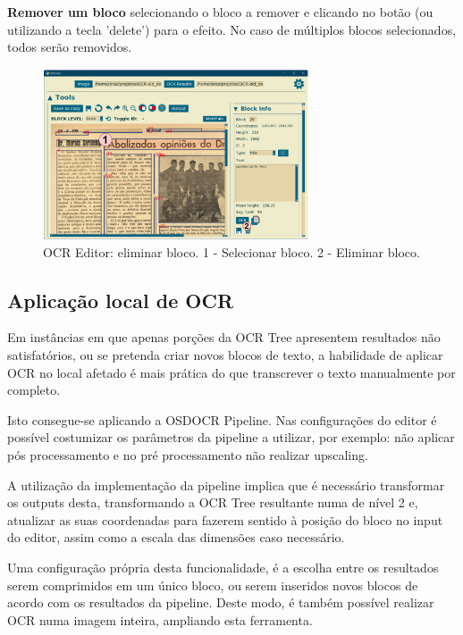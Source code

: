 \textbf{Remover um bloco} selecionando o bloco a remover e clicando no botão (ou utilizando a tecla 'delete') para o efeito. No caso de múltiplos blocos selecionados, todos serão removidos.

\begin{figure}[H]
	\centering
	\includegraphics[width=0.7\textwidth]{images/ilustracoes/ocr_editor_delete_block.png}
	\caption{OCR Editor: eliminar bloco. 1 - Selecionar bloco. 2 - Eliminar bloco.}
	\label{fig:ocr_editor_delete_block}
\end{figure}



\subsection{Aplicação local de OCR}

Em instâncias em que apenas porções da OCR Tree apresentem resultados não satisfatórios, ou se pretenda criar novos blocos de texto, a habilidade de aplicar OCR no local afetado é mais prática do que transcrever o texto manualmente por completo.

Isto consegue-se aplicando a OSDOCR Pipeline. Nas configurações do editor é possível costumizar os parâmetros da pipeline a utilizar, por exemplo: não aplicar pós processamento e no pré processamento não realizar upscaling.

A utilização da implementação da pipeline implica que é necessário transformar os outputs desta, transformando a OCR Tree resultante numa de nível 2 e, atualizar as suas coordenadas para fazerem sentido à posição do bloco no input do editor, assim como a escala das dimensões caso necessário.

Uma configuração própria desta funcionalidade, é a escolha entre os resultados serem comprimidos em um único bloco, ou serem inseridos novos blocos de acordo com os resultados da pipeline. Deste modo, é também possível realizar OCR numa imagem inteira, ampliando esta ferramenta.

